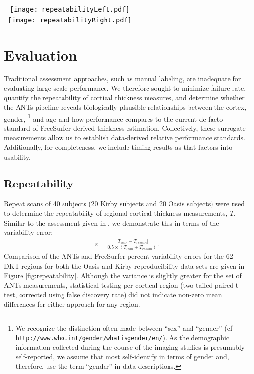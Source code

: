 \begin{figure*}[htb]
  \centering
  \begin{tabular}{c}
  \texttt{[image: repeatabilityLeft.pdf]} \\
  \texttt{[image: repeatabilityRight.pdf]}
  \end{tabular}
  \caption{Percent error variability for both ANTs and FreeSurfer pipelines
           over the left and right hemispheres within the 62 regions defined by the
           Desikan-Killiany-Tourville atlas.  Both methods demonstrate good repeatability
           qualities.
           }
  \label{fig:repeatability}
\end{figure*}


\section{Evaluation}
Traditional assessment approaches, such as manual
labeling, are inadequate for evaluating large-scale performance.  
We therefore sought to minimize failure rate, quantify the repeatability of cortical
thickness measures, and
determine whether the ANTs pipeline reveals biologically plausible relationships
between the cortex, gender,%
\footnote{
We recognize the distinction often made between ``sex'' and ``gender'' 
(cf {\tt http://www.who.int/gender/whatisgender/en/}).
As the demographic information collected during the course of the imaging studies 
is presumably self-reported, we assume that most self-identify in terms of 
gender and, therefore, use the term ``gender'' in data
descriptions.
}
and age and how performance compares
to the current de facto standard of FreeSurfer-derived thickness estimation.
Collectively, these surrogate
measurements allow us to establish data-derived relative performance standards.
Additionally, for completeness, we include timing results as that factors into
usability.

\subsection{Repeatability}%

Repeat scans of 40 subjects (20 Kirby subjects and 20 Oasis subjects) were 
used to determine the repeatability of regional cortical thickness 
measurements, $T$.  Similar to the assessment given in \cite{jovicich2013}, we
demonstrate this in terms of the variability error:
\begin{align}
\varepsilon = \frac{|T_{scan} - T_{rescan}|}{0.5 \times (T_{scan} + T_{rescan})}.
\end{align}
Comparison of the ANTs and FreeSurfer percent variability errors for the 62 DKT 
regions for both the Oasis and Kirby reproducibility data sets
are given in Figure \ref{fig:repeatability}.  Although the variance is slightly greater 
for the set of ANTs measurements, statistical testing per cortical region 
(two-tailed paired t-test, corrected using false discovery rate) did not indicate 
non-zero mean differences for either approach for any region.

